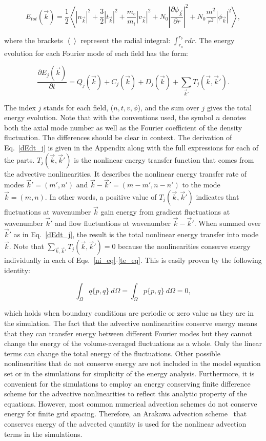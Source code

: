 \documentclass[showpacs,preprintnumbers,amsmath,amssymb,superscriptaddress,aip]{revtex4-1}
\def\beq{\begin{equation}}
\def\eeq{\end{equation}}
\newcommand{\pdiff}[2]{\frac{\partial#1}{\partial#2}}
\begin{document}
\beq
\label{E_k}
E_{tot}(\vec{k}) = \frac{1}{2} \left< |n_{\vec{k}}|^2 + \frac{3}{2} |t_{\vec{k}}|^2 + \frac{m_e}{m_i} |v_{\vec{k}}|^2 + N_0 \left| \pdiff{\phi_{\vec{k}}}{r} \right|^2 + N_0 \frac{m^2}{r^2} |\phi_{\vec{k}}|^2 \right>,
\eeq

where the brackets $\left< \right>$ represent the radial integral: $\int_{r_a}^{r_b} r dr$. 
The energy evolution for each Fourier mode of each field has the form:

\beq
\label{dEdt_j}
\pdiff{E_{j}(\vec{k})}{t} = Q_{j}(\vec{k}) + C_{j}(\vec{k}) + D_j(\vec{k}) + \sum_{\vec{k}'} T_{j}(\vec{k},\vec{k}').
\eeq

The index $j$ stands for each field, ($n,t,v,\phi$), and the sum over $j$ gives the total energy evolution. 
Note that with the conventions used, the symbol $n$ denotes both the axial mode number as
well as the Fourier coefficient of the density fluctuation. The differences should be clear in context. The derivation of Eq.~\ref{dEdt_j} 
is given in the Appendix along with the full expressions for each of the parts. $T_{j}(\vec{k},\vec{k}')$ is the nonlinear energy transfer function that comes from the advective
nonlinearities.  It describes the nonlinear energy transfer rate of modes $\vec{k}'=(m',n')$ and $\vec{k}-\vec{k}'=(m-m',n-n')$ to the mode $\vec{k}=(m,n)$. 
In other words, a positive value of $T_{j}(\vec{k},\vec{k}')$ indicates that fluctuations
at wavenumber $\vec{k}$ gain energy from gradient fluctuations at wavenumber $\vec{k}'$ and flow fluctuations at wavenumber $\vec{k}-\vec{k}'$.
When summed over $\vec{k}'$ as in Eq.~\ref{dEdt_j}, the result is the total
nonlinear energy transfer into mode $\vec{k}$. 
Note that $\sum_{\vec{k},\vec{k}'} T_{j}(\vec{k},\vec{k}') = 0$ because the nonlinearities conserve energy individually in each of Eqs.~\ref{ni_eq}-\ref{te_eq}.
This is easily proven by the following identity:

\beq
\label{poisson_rln}
\int_\Omega q \{p,q\} \ d\Omega = \int_\Omega p \{p,q\} \ d\Omega = 0,
\eeq

which holds when boundary conditions are periodic or zero value as they are in the simulation. 
The fact that the advective nonlinearities conserve energy means that they can transfer energy between different Fourier modes
but they cannot change the energy of the volume-averaged fluctuations
as a whole. Only the linear terms can change the total energy of the fluctuations.
Other possible nonlinearities that do not conserve energy are not
included in the model equation set or in the simulations for simplicity of the energy analysis. 
Furthermore, it is convenient for the simulations to employ an energy conserving finite difference
scheme for the advective nonlinearities to reflect this analytic property of the equations. 
However, most common numerical advection schemes do not conserve energy for finite grid spacing. Therefore, an Arakawa advection scheme~\cite{arakawa1966} that conserves 
energy of the advected quantity is used for the nonlinear advection terms in the simulations.
\end{document}
